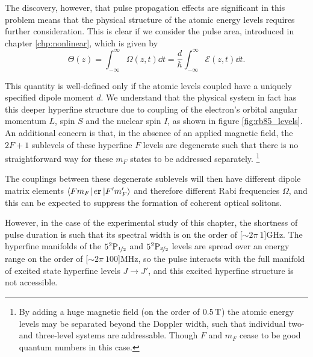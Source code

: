     The discovery, however, that pulse propagation effects are significant in
    this problem means that the physical structure of the atomic energy levels
    requires further consideration. This is clear if we consider the pulse area,
    introduced in chapter \ref{chp:nonlinear}, which is given by
    \begin{equation}
      \Theta(z) = \int^\infty_{-\infty} \Omega(z,t) \dd t
                = \frac{d}{\hbar} \int^\infty_{-\infty} \mathcal{E}(z,t) \dd t.
    \end{equation}

    This quantity is well-defined only if the atomic levels coupled have a
    uniquely specified dipole moment $d$. We understand that the physical system
    in fact has this deeper hyperfine structure due to coupling of the
    electron's orbital angular momentum $L$, spin $S$ and the nuclear spin $I$,
    as shown in figure \ref{fig:rb85_levels}. An additional concern is that, in
    the absence of an applied magnetic field, the $2F + 1$ sublevels of these
    hyperfine $F$ levels are degenerate such that there is no
    straightforward way for these $m_F$ states to be addressed separately.
    \footnote{By adding a huge magnetic field (on the order of $\unit[0.5]{T}$)
    the atomic energy levels may be separated beyond the Doppler width, such
    that individual two- and three-level systems are
    addressable.\cite{Whiting:15,Zentile2014} Though $F$ and $m_F$ cease to be
    good quantum numbers in this case.}

    The couplings between these degenerate sublevels will then have different
    dipole matrix elements $\Bra{F m_F} e \mathbf{r} \Ket{F' m'_F}$ and
    therefore different Rabi frequencies $\Omega$,  and this can be expected to
    suppress the formation of coherent optical solitons.

    However, in the case of the experimental study of this chapter, the
    shortness of pulse duration  is such that its spectral width is on the order
    of \unit[$\sim 2\pi~1$]{GHz}. The hyperfine manifolds of the
    $5^2\mathrm{P}_{\nicefrac{1}{2}}$ and $5^2\mathrm{P}_{\nicefrac{3}{2}}$
    levels are spread over an energy range on the order of \unit[$\sim
    2\pi~100$]{MHz}, so the pulse interacts with the full manifold of excited
    state hyperfine levels $J \rightarrow J'$, and this excited hyperfine
    structure is not accessible.

